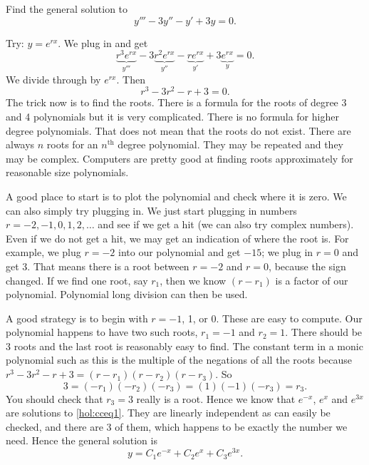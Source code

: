 \documentclass[12pt]{book}
\begin{document}
\begin{example}
Find the general solution to
\begin{equation} \label{hol:cceq1}
y''' - 3 y'' - y' + 3y = 0 .
\end{equation}

Try: $y = e^{rx}$.  We plug in and get
\begin{equation*}
\underbrace{r^3 e^{rx}}_{y'''} - 3 \underbrace{r^2 e^{rx}}_{y''} -
\underbrace{r e^{rx}}_{y'} + 3 \underbrace{e^{rx}}_{y} = 0 .
\end{equation*}
We divide through by $e^{rx}$.  Then 
\begin{equation*}
r^3 - 3 r^2 - r + 3 = 0 .
\end{equation*}
The trick now is to find the roots.  There is a formula for the roots of
degree 3 and 4 polynomials but it is very complicated.  There is no formula
for higher degree polynomials.  That does not mean that the roots do not
exist.  There are always
$n$ roots for an $n^{\text{th}}$ degree polynomial.  They may be
repeated
and they may be complex.  Computers are pretty good at finding roots
approximately for reasonable size polynomials.

A good place to start is to plot the polynomial and check where it is zero.
We can also simply try plugging in.  We
just start plugging
in numbers $r=-2,-1,0,1,2,\ldots$ and see if we get a hit (we can also
try complex numbers).  Even
if we do not get a hit, we may get an indication
of where the root is.  For example, we plug
$r=-2$ into our polynomial and get $-15$; we plug in $r=0$ and get 3.
That means there is a root between $r=-2$ and $r=0$,
because the sign changed.
If we find one root, say $r_1$, then we know $(r-r_1)$ is a factor
of our polynomial.  Polynomial long division can then be used.

A good strategy is to begin with $r=-1$, 1, or 0.  These are
easy to compute.  Our polynomial happens to have
two such roots, $r_1 = -1$
and $r_2 = 1$.  There should be 3 roots and the last root is reasonably
easy to find.  The constant
term in a monic polynomial such as this is the multiple of the negations of all the roots
because $r^3 - 3 r^2 - r + 3 = (r-r_1)(r-r_2)(r-r_3)$.
So
\begin{equation*}
3 = (-r_1)(-r_2)(-r_3) = (1)(-1)(-r_3) = r_3 .
\end{equation*}
You should check that $r_3 = 3$ really
is a root.  Hence we know that $e^{-x}$, $e^{x}$
and $e^{3x}$ are solutions to \eqref{hol:cceq1}.  They are linearly independent
as can easily be checked, and there are 3 of them, which happens to be exactly
the number we need.  Hence the general solution is
\begin{equation*}
y = C_1 e^{-x} + C_2 e^{x} + C_3 e^{3x} .
\end{equation*}


\end{example}
\end{document}
